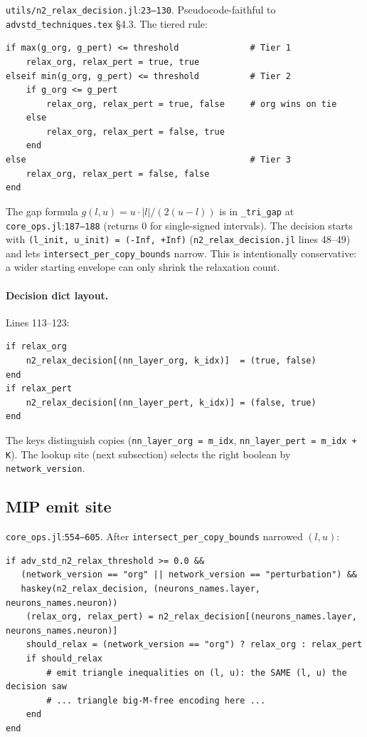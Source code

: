 \documentclass[11pt]{article}
\newcommand{\src}[1]{\texttt{\small #1}}
\newcommand{\fileline}[2]{\src{#1}:\src{#2}}
\begin{document}
\fileline{utils/n2\_relax\_decision.jl}{23--130}. Pseudocode-faithful
to \texttt{advstd\_techniques.tex} \S 4.3. The tiered rule:

\begin{lstlisting}[style=jl]
if max(g_org, g_pert) <= threshold              # Tier 1
    relax_org, relax_pert = true, true
elseif min(g_org, g_pert) <= threshold          # Tier 2
    if g_org <= g_pert
        relax_org, relax_pert = true, false     # org wins on tie
    else
        relax_org, relax_pert = false, true
    end
else                                            # Tier 3
    relax_org, relax_pert = false, false
end
\end{lstlisting}

The gap formula $g(l, u) = u \cdot |l| / (2(u-l))$ is in
\src{\_tri\_gap} at \fileline{core\_ops.jl}{187--188} (returns 0 for
single-signed intervals). The decision starts with
\src{(l\_init, u\_init) = (-Inf, +Inf)} (\src{n2\_relax\_decision.jl}
lines 48--49) and lets \src{intersect\_per\_copy\_bounds} narrow.
This is intentionally conservative: a wider starting envelope can
only shrink the relaxation count.

\paragraph{Decision dict layout.}
Lines 113--123:
\begin{lstlisting}[style=jl]
if relax_org
    n2_relax_decision[(nn_layer_org, k_idx)]  = (true, false)
end
if relax_pert
    n2_relax_decision[(nn_layer_pert, k_idx)] = (false, true)
end
\end{lstlisting}
The keys distinguish copies (\src{nn\_layer\_org = m\_idx},
\src{nn\_layer\_pert = m\_idx + K}). The lookup site (next subsection)
selects the right boolean by \src{network\_version}.

\subsection{MIP emit site}

\fileline{core\_ops.jl}{554--605}. After
\src{intersect\_per\_copy\_bounds} narrowed $(l, u)$:

\begin{lstlisting}[style=jl]
if adv_std_n2_relax_threshold >= 0.0 &&
   (network_version == "org" || network_version == "perturbation") &&
   haskey(n2_relax_decision, (neurons_names.layer, neurons_names.neuron))
    (relax_org, relax_pert) = n2_relax_decision[(neurons_names.layer, neurons_names.neuron)]
    should_relax = (network_version == "org") ? relax_org : relax_pert
    if should_relax
        # emit triangle inequalities on (l, u): the SAME (l, u) the decision saw
        # ... triangle big-M-free encoding here ...
    end
end
\end{lstlisting}
\end{document}
